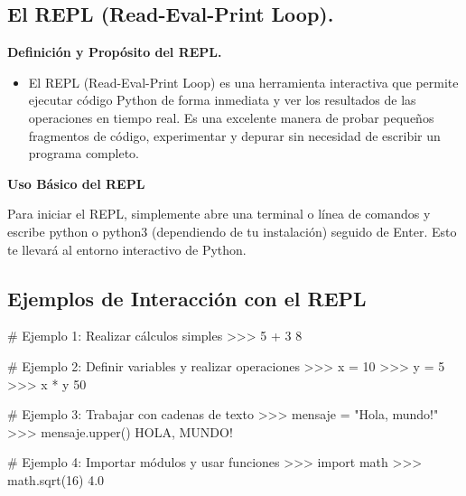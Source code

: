 \documentclass[
  a4paper,
  DIV=11,
  numbers=noendperiod,
  onepage,
  openany]{scrreprt}
\newenvironment{Shaded}{\begin{snugshade}}{\end{snugshade}}
\newcommand{\CommentTok}[1]{\textcolor[rgb]{0.37,0.37,0.37}{#1}}
\newcommand{\DecValTok}[1]{\textcolor[rgb]{0.68,0.00,0.00}{#1}}
\newcommand{\FloatTok}[1]{\textcolor[rgb]{0.68,0.00,0.00}{#1}}
\newcommand{\ImportTok}[1]{\textcolor[rgb]{0.00,0.46,0.62}{#1}}
\newcommand{\NormalTok}[1]{\textcolor[rgb]{0.00,0.23,0.31}{#1}}
\newcommand{\OperatorTok}[1]{\textcolor[rgb]{0.37,0.37,0.37}{#1}}
\newcommand{\StringTok}[1]{\textcolor[rgb]{0.13,0.47,0.30}{#1}}
\providecommand{\tightlist}{%
  \setlength{\itemsep}{0pt}\setlength{\parskip}{0pt}}\usepackage{longtable,booktabs,array}
\begin{document}
\subsection{El REPL (Read-Eval-Print
Loop).}\label{el-repl-read-eval-print-loop.}

\textbf{Definición y Propósito del REPL.}

\begin{itemize}
\tightlist
\item
  El REPL (Read-Eval-Print Loop) es una herramienta interactiva que
  permite ejecutar código Python de forma inmediata y ver los resultados
  de las operaciones en tiempo real. Es una excelente manera de probar
  pequeños fragmentos de código, experimentar y depurar sin necesidad de
  escribir un programa completo.
\end{itemize}

\textbf{Uso Básico del REPL}

Para iniciar el REPL, simplemente abre una terminal o línea de comandos
y escribe python o python3 (dependiendo de tu instalación) seguido de
Enter. Esto te llevará al entorno interactivo de Python.

\subsection{Ejemplos de Interacción con el
REPL}\label{ejemplos-de-interacciuxf3n-con-el-repl}

\begin{Shaded}
\begin{Highlighting}[]
\CommentTok{\# Ejemplo 1: Realizar cálculos simples}
\OperatorTok{\textgreater{}\textgreater{}\textgreater{}} \DecValTok{5} \OperatorTok{+} \DecValTok{3}
\DecValTok{8}

\CommentTok{\# Ejemplo 2: Definir variables y realizar operaciones}
\OperatorTok{\textgreater{}\textgreater{}\textgreater{}}\NormalTok{ x }\OperatorTok{=} \DecValTok{10}
\OperatorTok{\textgreater{}\textgreater{}\textgreater{}}\NormalTok{ y }\OperatorTok{=} \DecValTok{5}
\OperatorTok{\textgreater{}\textgreater{}\textgreater{}}\NormalTok{ x }\OperatorTok{*}\NormalTok{ y}
\DecValTok{50}

\CommentTok{\# Ejemplo 3: Trabajar con cadenas de texto}
\OperatorTok{\textgreater{}\textgreater{}\textgreater{}}\NormalTok{ mensaje }\OperatorTok{=} \StringTok{"Hola, mundo!"}
\OperatorTok{\textgreater{}\textgreater{}\textgreater{}}\NormalTok{ mensaje.upper()}
\CommentTok{\textquotesingle{}HOLA, MUNDO!\textquotesingle{}}

\CommentTok{\# Ejemplo 4: Importar módulos y usar funciones}
\OperatorTok{\textgreater{}\textgreater{}\textgreater{}} \ImportTok{import}\NormalTok{ math}
\OperatorTok{\textgreater{}\textgreater{}\textgreater{}}\NormalTok{ math.sqrt(}\DecValTok{16}\NormalTok{)}
\FloatTok{4.0}
\end{Highlighting}
\end{Shaded}
\end{document}
